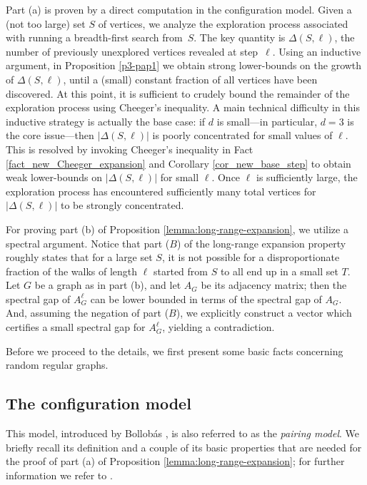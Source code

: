 \documentclass[11pt,leqno]{amsart}
\theoremstyle{remark}
\theoremstyle{plain}
\begin{document}
Part (a) is proven by a direct computation in the configuration model. Given a (not too large) set
$S$ of vertices, we analyze the exploration process associated with running a breadth-first search from~$S$.
The key quantity is $\Delta(S,\ell)$, the number of previously unexplored vertices revealed at step~$\ell$.
Using an inductive argument, in Proposition \ref{p3-pap1} we obtain strong lower-bounds on the growth of $\Delta(S,\ell)$,
until a (small) constant fraction of all vertices have been discovered. At this point, it is sufficient to
crudely bound the remainder of the exploration process using Cheeger's inequality.
A main technical difficulty in this inductive strategy is actually the base case: if $d$ is small---in particular, $d= 3$ is the core issue---then $|\Delta(S,\ell)|$ is poorly concentrated for small values of $\ell$. This is resolved by invoking Cheeger's inequality in Fact \ref{fact_new_Cheeger_expansion} and Corollary \ref{cor_new_base_step} to obtain weak lower-bounds on $|\Delta(S,\ell)|$ for small $\ell$. Once $\ell$ is sufficiently large, the exploration process has encountered sufficiently many total vertices for $|\Delta(S,\ell)|$ to be strongly concentrated.

For proving part (b) of Proposition \ref{lemma:long-range-expansion}, we utilize a spectral argument. Notice that part (\hyperref[Part-B]{$B$}) of the long-range
expansion property roughly states that for a large set $S$, it is not possible for a disproportionate fraction
of the walks of length $\ell$ started from $S$ to all end up in a small set $T$. Let $G$ be a graph as in
part (b), and let $A_G$ be its adjacency matrix; then the spectral gap of $A_G^{\ell}$ can be lower bounded
in terms of the spectral gap of $A_G$. And, assuming the negation of part (\hyperref[Part-B]{$B$}),
we explicitly construct a vector which certifies a small spectral gap for $A_G^{\ell}$, yielding a contradiction.

Before we proceed to the details, we first present some basic facts concerning random regular graphs.

\subsection*{The configuration model}

This model, introduced by Bollob\'{a}s \cite{Bol80}, is also referred to as the \emph{pairing model}.
We briefly recall its definition and a couple of its basic properties that are needed for the proof of
part (a) of Proposition \ref{lemma:long-range-expansion}; for further information we refer to
\cite{Bol01,JLR00,Wo99}.
\end{document}

